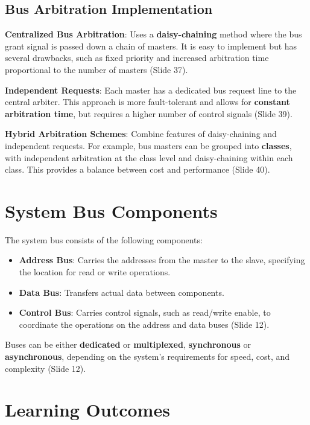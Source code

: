 \documentclass[
  14pt,
  a4paper,
  numbers=noendperiod,
  headinclude=true,
  footinclude=true,
  DIV=calc]{scrreprt}
\begin{document}
\subsection{Bus Arbitration
Implementation}\label{bus-arbitration-implementation}

\textbf{Centralized Bus Arbitration}: Uses a \textbf{daisy-chaining}
method where the bus grant signal is passed down a chain of masters. It
is easy to implement but has several drawbacks, such as fixed priority
and increased arbitration time proportional to the number of masters
(Slide 37).

\textbf{Independent Requests}: Each master has a dedicated bus request
line to the central arbiter. This approach is more fault-tolerant and
allows for \textbf{constant arbitration time}, but requires a higher
number of control signals (Slide 39).

\textbf{Hybrid Arbitration Schemes}: Combine features of daisy-chaining
and independent requests. For example, bus masters can be grouped into
\textbf{classes}, with independent arbitration at the class level and
daisy-chaining within each class. This provides a balance between cost
and performance (Slide 40).

\section{System Bus Components}\label{system-bus-components}

The system bus consists of the following components:

\begin{itemize}
\item
  \textbf{Address Bus}: Carries the addresses from the master to the
  slave, specifying the location for read or write operations.
\item
  \textbf{Data Bus}: Transfers actual data between components.
\item
  \textbf{Control Bus}: Carries control signals, such as read/write
  enable, to coordinate the operations on the address and data buses
  (Slide 12).
\end{itemize}

Buses can be either \textbf{dedicated} or \textbf{multiplexed},
\textbf{synchronous} or \textbf{asynchronous}, depending on the system's
requirements for speed, cost, and complexity (Slide 12).

\section{Learning Outcomes}\label{learning-outcomes}
\end{document}
